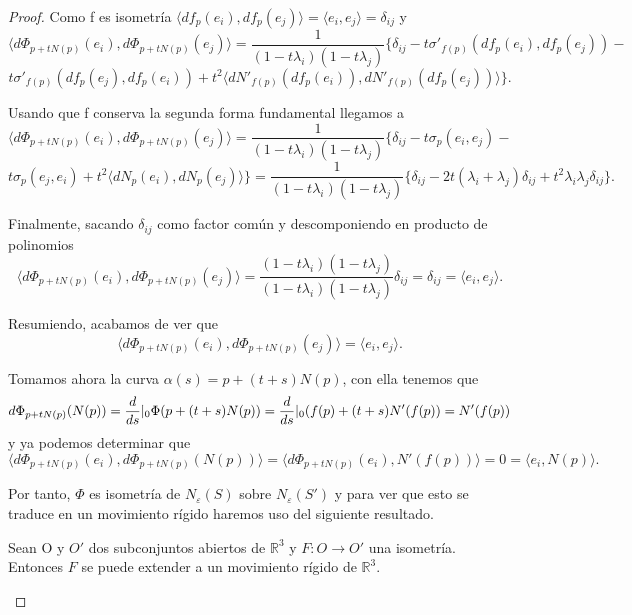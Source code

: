 \begin{proof}
	Como f es isometría $\langle df_p(e_i), df_p(e_j) \rangle = \langle e_i, e_j \rangle = \delta_{ij}$ y
	\[
	\langle d\Phi_{p + tN(p)}(e_i), d\Phi_{p + tN(p)}(e_j) \rangle = \frac{1}{(1 - t\lambda_i)(1 - t\lambda_j)}\{\delta_{ij} - t\sigma'_{f(p)}(df_p(e_i), df_p(e_j)) -  
	\]
	\[
	t\sigma'_{f(p)}(df_p(e_j), df_p(e_i)) + t^2 \langle dN'_{f(p)}(df_p(e_i)), dN'_{f(p)}(df_p(e_j)) \rangle \}.
	\]
	
	${ }$\\	
	
	Usando que f conserva la segunda forma fundamental llegamos a
	\[
	\langle d\Phi_{p + tN(p)}(e_i), d\Phi_{p + tN(p)}(e_j) \rangle = \frac{1}{(1 - t\lambda_i)(1 - t\lambda_j)}\{\delta_{ij} - t\sigma_p(e_i, e_j) - 
	\]
	\[
	t\sigma_p(e_j, e_i) + t^2 \langle dN_p(e_i), dN_p(e_j) \rangle \} = \frac{1}{(1 - t\lambda_i)(1 - t\lambda_j)}\{\delta_{ij} - 2t(\lambda_i + \lambda_j)\delta_{ij} + t^2\lambda_i\lambda_j\delta_{ij}\}.
	\]
	
	Finalmente, sacando $\delta_{ij}$ como factor común y descomponiendo en producto de polinomios
	\[
	\langle d\Phi_{p + tN(p)}(e_i), d\Phi_{p + tN(p)}(e_j) \rangle = \frac{(1 - t\lambda_i)(1 - t\lambda_j)}{(1 - t\lambda_i)(1 - t\lambda_j)}\delta_{ij} = \delta_{ij} = \langle e_i, e_j \rangle.
	\]
	
	Resumiendo, acabamos de ver que
	\[
	\langle d\Phi_{p + tN(p)}(e_i), d\Phi_{p + tN(p)}(e_j) \rangle = \langle e_i, e_j\rangle.
	\]
	
	Tomamos ahora la curva $\alpha(s) = p + (t + s)N(p)$, con ella tenemos que
	\[
	d\Phi_{p + tN(p)}(N(p)) = \frac{d}{ds}\arrowvert_0\Phi(p + (t + s)N(p)) = \frac{d}{ds}\arrowvert_0(f(p) + (t + s)N'(f(p)) = N'(f(p))
	\]
	y ya podemos determinar que
	\[
	 \langle d\Phi_{p + tN(p)}(e_i), d\Phi_{p + tN(p)}(N(p)) \rangle = \langle d\Phi_{p + tN(p)}(e_i), N'(f(p)) \rangle = 0 = \langle e_i, N(p) \rangle.
	\]
	
	Por tanto, $\Phi$ es isometría de $N_\varepsilon(S)$ sobre $N_\varepsilon(S')$ y para ver que esto se traduce en un movimiento rígido haremos uso del siguiente resultado.
	
	\begin{teorema}
		Sean O y $O'$ dos subconjuntos abiertos de $\mathbb{R}^3$ y $F : O \to O'$ una isometría. Entonces $F$ se puede extender a un movimiento rígido de $\mathbb{R}^3$.
	\end{teorema}
	

\end{proof}
